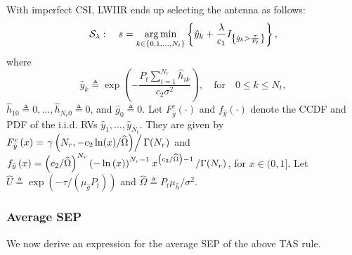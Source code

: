 \documentclass[12pt,draftcls,peerreview,onecolumn]{IEEEtran}
\newcommand{\cbrac}[1]{\left\{{#1}\right\}}
\newcommand{\indic}[1]{I_{\cbrac{#1}}}
\newcommand{\define}{\triangleq}
\DeclareMathOperator*{\argmin}{arg\,min}
\newcommand{\SEP}{\text{SEP}}
\newcommand{\nx}{{0}}
\newcommand{\lam}{\lambda}
\newcommand{\lamstar}{\lam^{*}}
\newcommand{\Nt}{{N_t}}
\newcommand{\Nr}{{N_r}}
\newcommand{\Pt}{{P_t}}
\newcommand{\such}{h}
\newcommand{\puch}{g}
\newcommand{\noisevar}{\sigma^2}
\newcommand{\outmax}{O_{\text{max}}}
\newcommand{\itau}{\tau}
\newcommand{\cone}{c_{1}}
\newcommand{\ctwo}{c_{2}}
\newcommand{\out}{O}
\newcommand{\taubypt}{\frac{\itau}{\Pt}}
\newcommand{\gkhatgrtaubypt}[1]{{\gkhat{#1}}>\taubypt}
\newcommand{\ghatindic}[1]{\indic{\gkhatgrtaubypt{#1}}}
\newcommand{\lambym}{\frac{\lam}{\cone}}
\newcommand{\lamstarbym}{\frac{\lamstar}{\cone}}
\newcommand{\ykhatplusgkhat}[1]{ \ykhat{#1} + \lambym\ghatindic{#1}}
\newcommand{\al}{\ctwo}
\newcommand{\snr}{\Omega}
\newcommand{\albysnr}[1][]{\frac{\al#1}{\snr}}
\newcommand{\un}{U}
\newcommand{\allopts}{\left\{\nx,1,\ldots,\Nt\right\}}
\newcommand{\callamrule}{{\cal S_{{\lam}}}}
\newcommand{\outlam}{\out_{\lam}}
\newcommand{\unhat}{\widehat{\un}}
\newcommand{\snrhat}{\widehat{\snr}}
\newcommand{\hhat}{\hat{\such}}
\newcommand{\ghat}{\hat{\puch}}
\newcommand{\yhat}{\hat{y}}
\newcommand{\hkhat}[1]{\hhat_{#1}}
\newcommand{\gkhat}[1]{\ghat_{#1}}
\newcommand{\ykhat}[1]{\hat{y}_{#1}}
\newcommand{\muhhat}{\mu_{\hhat}}
\newcommand{\mughat}{\mu_{\ghat}}
\newcommand{\ccdfghatinline}{\exp\left( {-{\itau}/{\left( \mughat\Pt\right) }}\right) }
\newcommand{\ccdfyhatrv}[1]{F^{c}_{\yhat}\left(#1 \right) }
\begin{document}
With imperfect CSI, LWIIR ends up selecting the antenna as follows:
\begin{equation}
\callamrule:\quad s=\argmin\limits_{k\in\allopts} \left\{ \ykhatplusgkhat{k} \right\},
\label{eq:shat}
\end{equation}
where 
\begin{equation}
\ykhat{k} \define  \exp\left({- \frac{\Pt\sum_{i=1}^{\Nr}\hkhat{ik}}{\ctwo\noisevar} }\right), \quad \text{for} \quad 0\leq k \leq\Nt,
\label{eq:yihat_def}
\end{equation}
$\hkhat{1\nx} \define 0,\ldots,\hkhat{\Nr\nx} \define 0$, and $\gkhat{\nx} \define 0$. Let $F_{\yhat}^{c}(\cdot)$ and $f_{\yhat}(\cdot)$ denote the CCDF and PDF of the i.i.d. RVs $\ykhat{1},\dots,\ykhat{\Nt}$. They are given by $F_{\yhat}^{c}\left(x\right) = \left. {\gamma\left(\Nr,-\ctwo\ln(x)/\snrhat\right)} \right/ {\Gamma(\Nr)}$ and $f_{\yhat}\left(x\right) = { \left( \ctwo/\snrhat \right)^{\Nr} \left(-\ln\left(x \right)\right)^{\Nr-1} x^{\left( \ctwo/\snrhat \right) - 1}}\left/{\Gamma(\Nr)}\right.$, for $x \in (0,1]$.  Let  $\unhat\define\ccdfghatinline$ and  $\snrhat\define{\Pt\muhhat}/{\noisevar}$.  


\newcommand{\D}{\Delta}

\newcommand{\pdfyhatNr}{\left(\ln\left(\frac{1}{x}\right)\right)^{\Nr-1}x^{\albysnr[]-1}} %
\newcommand{\yhattimespdfyNr}{\left[-\ln\left(x\right)\right]^{\Nr-1}x^{\D}} %
\newcommand{\yhatpluslamstartimespdfyNr}{\left[-\ln\left({x+\lamstarbym}\right)\right]^{\Nr-1}\left(x+\lamstarbym\right)^{\D}} %
\newcommand{\yhatpluslamtimespdfyNr}{\left[-\ln\left({x+\lambym}\right)\right]^{\Nr-1}\left(x+\lambym\right)^{\!\!\D}} %
\newcommand{\unccdfyhat}[2]{{#1}\,\,\ccdfyhatrv{#2}}


\newcommand{\avgSEPhat}{\widehat{\SEP}}

\subsubsection{ Average SEP} We now derive an expression for the average SEP of the above TAS rule. 
\end{document}
